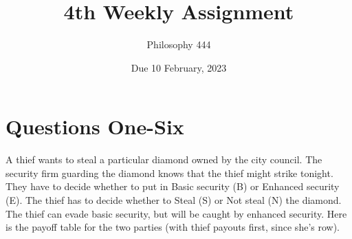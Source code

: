 \documentclass[
  11pt,
]{article}
\title{4th Weekly Assignment}
\author{Philosophy 444}
\date{Due 10 February, 2023}
\begin{document}
\maketitle

\hypertarget{questions-one-six}{%
\section{Questions One-Six}\label{questions-one-six}}

A thief wants to steal a particular diamond owned by the city council.
The security firm guarding the diamond knows that the thief might strike
tonight. They have to decide whether to put in Basic security (B) or
Enhanced security (E). The thief has to decide whether to Steal (S) or
Not steal (N) the diamond. The thief can evade basic security, but will
be caught by enhanced security. Here is the payoff table for the two
parties (with thief payouts first, since she's row).

 
  \providecommand{\huxb}[2]{\arrayrulecolor[RGB]{#1}\global\arrayrulewidth=#2pt}
  \providecommand{\huxvb}[2]{\color[RGB]{#1}\vrule width #2pt}
  \providecommand{\huxtpad}[1]{\rule{0pt}{#1}}
  \providecommand{\huxbpad}[1]{\rule[-#1]{0pt}{#1}}
\end{document}
